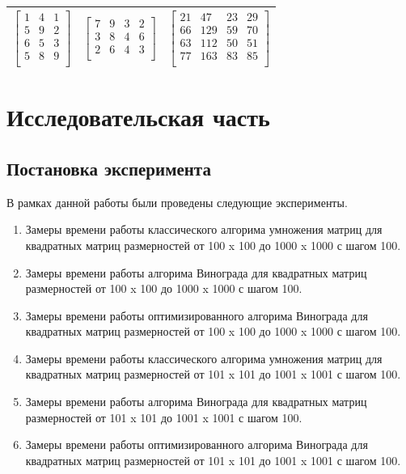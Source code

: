 \documentclass[a4paper,14pt]{report}
\begin{document}
\begin{table}[h]
\begin{tabular}{|c | c | c |}
		$\begin{bmatrix}
		1 & 4 & 1 \\
		5 & 9 & 2 \\
		6 & 5 & 3 \\
		5 & 8 & 9 \\
		\end{bmatrix}$ &
		$\begin{bmatrix}
		7 & 9 & 3 & 2 \\
		3 & 8 & 4 & 6 \\
		2 & 6 & 4 & 3 \\
		\end{bmatrix}$ &
		$\begin{bmatrix}
		21 & 47 & 23 & 29 \\
		66 & 129 & 59 & 70 \\
		63 & 112 & 50 & 51 \\
		77 & 163 & 83 & 85 \\
		\end{bmatrix}$ \\
		\hline

		\end{tabular}
\end{table}

\chapter*{Исследовательская часть}

\section*{Постановка эксперимента}

В рамках данной работы были проведены следующие эксперименты.

\begin{enumerate}
	\item Замеры времени работы классического алгорима умножения матриц для квадратных матриц размерностей от 100 x 100 до 1000 x 1000 с шагом 100.
	\item Замеры времени работы алгорима Винограда для квадратных матриц размерностей от 100 x 100 до 1000 x 1000 с шагом 100.
	\item Замеры времени работы оптимизированного алгорима Винограда для квадратных матриц размерностей от 100 x 100 до 1000 x 1000 с шагом 100.
	\item Замеры времени работы классического алгорима умножения матриц для квадратных матриц размерностей от 101 x 101 до 1001 x 1001 с шагом 100.
	\item Замеры времени работы алгорима Винограда для квадратных матриц размерностей от 101 x 101 до 1001 x 1001 с шагом 100.
	\item Замеры времени работы оптимизированного алгорима Винограда для квадратных матриц размерностей от 101 x 101 до 1001 x 1001 с шагом 100.
\end{enumerate}
\end{document}
